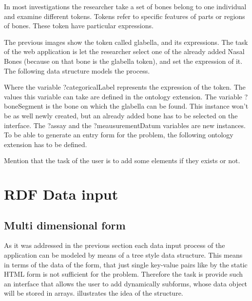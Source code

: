 In most investigations the researcher take a set of bones belong to one individual and examine different tokens. Tokens refer to specific features of parts or regions of bones. These token have particular expressions.


The previous images show the token called glabella, and its expressions. The task of the web application is let the researcher select one of the already added Nasal Bones (because on that bone is the glabella token), and set the expression of it. The following data structure models the process.


Where the variable ?categoricalLabel represents the expression of the token. The values this variable can take are defined in the ontology extension. The variable ?boneSegment is the bone on which the glabella can be found. This instance won’t be as well newly created, but an already added bone has to be selected on the interface. The ?assay and the ?meausurementDatum variables are new instances.  To be able to generate an entry form for the problem, the following ontology extension has to be defined.



Mention that the task of the user is to add some elements if they exists or not.


\section{RDF Data input}

\subsection{Multi dimensional form}

As it was addressed in the previous section each data input process of the application can be modeled by means of a tree style data structure. This means in terms of the data of the form, that just single key-value pairs like by the static HTML form is not sufficient for the problem. Therefore the task is provide such an interface that allows the user to add dynamically subforms, whose data object will be stored in arrays.  illustrates the idea of the structure. 


